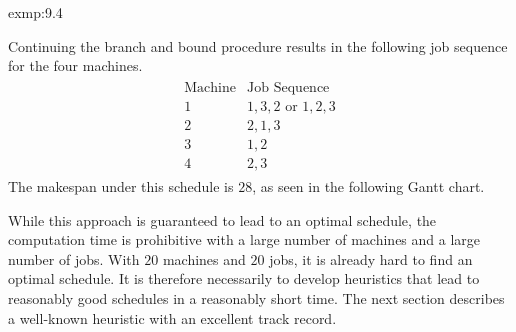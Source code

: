 \begin{exmp}{exmp:9.4}
\begin{center}
    \end{center}
    Continuing the branch and bound procedure results in the following job 
    sequence for the four machines. 
    \begin{align*}
        \begin{array}{c|c}
            \text{Machine} & \text{Job Sequence} \\ \hline 
            1 & 1, 3, 2 \text{ or } 1, 2, 3 \\ 
            2 & 2, 1, 3 \\ 
            3 & 1, 2 \\ 
            4 & 2, 3
        \end{array}
    \end{align*}
    The makespan under this schedule is $28$, as seen in the following Gantt chart. 
    \begin{center} 
    \end{center} 
    \vspace{-0.4cm}
\end{exmp}

While this approach is guaranteed to lead to an optimal schedule, the 
computation time is prohibitive with a large number of machines and a large 
number of jobs. With $20$ machines and $20$ jobs, it is already hard to 
find an optimal schedule. It is therefore necessarily to develop heuristics 
that lead to reasonably good schedules in a reasonably short time. The 
next section describes a well-known heuristic with an excellent track record.

